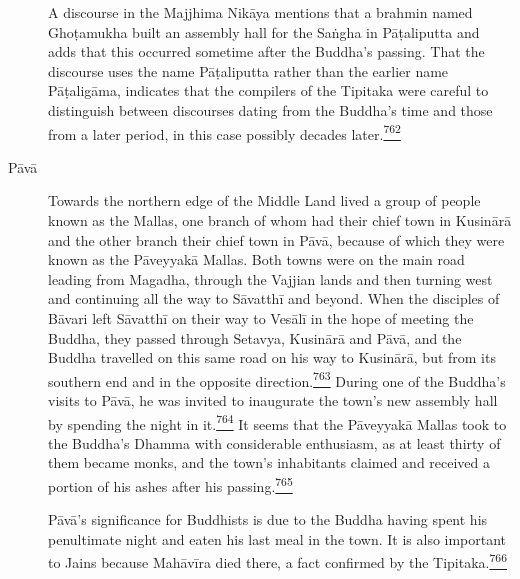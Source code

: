 \begin{description}
A discourse in the Majjhima Nikāya mentions that a brahmin named
Ghoṭamukha built an assembly hall for the Saṅgha in Pāṭaliputta and adds
that this occurred sometime after the Buddha's passing. That the
discourse uses the name Pāṭaliputta rather than the earlier name
Pāṭaligāma, indicates that the compilers of the Tipitaka were careful to
distinguish between discourses dating from the Buddha's time and those
from a later period, in this case possibly decades
later.\label{footprints_split_019.html_fnref762}\hyperref[footprints_split_025.htmlux5cux23fn762]{\textsuperscript{762}}
\item[Pāvā]
Towards the northern edge of the Middle Land lived a group of people
known as the Mallas, one branch of whom had their chief town in Kusinārā
and the other branch their chief town in Pāvā, because of which they
were known as the Pāveyyakā Mallas. Both towns were on the main road
leading from Magadha, through the Vajjian lands and then turning west
and continuing all the way to Sāvatthī and beyond. When the disciples of
Bāvari left Sāvatthī on their way to Vesālī in the hope of meeting the
Buddha, they passed through Setavya, Kusinārā and Pāvā, and the Buddha
travelled on this same road on his way to Kusinārā, but from its
southern end and in the opposite
direction.\label{footprints_split_019.html_fnref763}\hyperref[footprints_split_025.htmlux5cux23fn763]{\textsuperscript{763}}
During one of the Buddha's visits to Pāvā, he was invited to inaugurate
the town's new assembly hall by spending the night in
it.\label{footprints_split_019.html_fnref764}\hyperref[footprints_split_025.htmlux5cux23fn764]{\textsuperscript{764}}
It seems that the Pāveyyakā Mallas took to the Buddha's Dhamma with
considerable enthusiasm, as at least thirty of them became monks, and
the town's inhabitants claimed and received a portion of his ashes after
his
passing.\label{footprints_split_019.html_fnref765}\hyperref[footprints_split_025.htmlux5cux23fn765]{\textsuperscript{765}}

Pāvā's significance for Buddhists is due to the Buddha having spent his
penultimate night and eaten his last meal in the town. It is also
important to Jains because Mahāvīra died there, a fact confirmed by the
Tipitaka.\label{footprints_split_019.html_fnref766}\hyperref[footprints_split_025.htmlux5cux23fn766]{\textsuperscript{766}}


\end{description}
